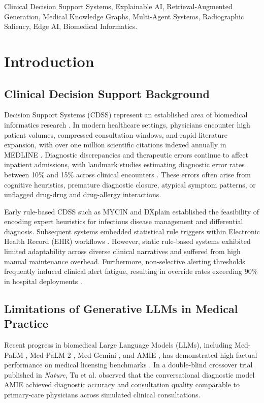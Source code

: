 \documentclass[journal,10pt,twocolumn]{IEEEtran}
\begin{document}
\begin{IEEEkeywords}
Clinical Decision Support Systems, Explainable AI, Retrieval-Augmented Generation, Medical Knowledge Graphs, Multi-Agent Systems, Radiographic Saliency, Edge AI, Biomedical Informatics.
\end{IEEEkeywords}

\IEEEpeerreviewmaketitle

\section{Introduction}

\subsection{Clinical Decision Support Background}
 Decision Support Systems (CDSS) represent an established area of biomedical informatics research \cite{shortliffe1975mycin, bates2003ten}. In modern healthcare settings, physicians encounter high patient volumes, compressed consultation windows, and rapid literature expansion, with over one million scientific citations indexed annually in MEDLINE \cite{nlm2023medline}. Diagnostic discrepancies and therapeutic errors continue to affect inpatient admissions, with landmark studies estimating diagnostic error rates between 10\% and 15\% across clinical encounters \cite{balogh2015improving}. These errors often arise from cognitive heuristics, premature diagnostic closure, atypical symptom patterns, or unflagged drug-drug and drug-allergy interactions.

Early rule-based CDSS such as MYCIN \cite{shortliffe1975mycin} and DXplain established the feasibility of encoding expert heuristics for infectious disease management and differential diagnosis. Subsequent systems embedded statistical rule triggers within Electronic Health Record (EHR) workflows \cite{rajkomar2018scalable, sendak2020real}. However, static rule-based systems exhibited limited adaptability across diverse clinical narratives and suffered from high manual maintenance overhead. Furthermore, non-selective alerting thresholds frequently induced clinical alert fatigue, resulting in override rates exceeding 90\% in hospital deployments \cite{bates2003ten, vandersijs2006overriding}.

\subsection{Limitations of Generative LLMs in Medical Practice}
Recent progress in biomedical Large Language Models (LLMs), including Med-PaLM \cite{singhal2023large}, Med-PaLM 2 \cite{singhal2023towards}, Med-Gemini \cite{saab2024capabilities}, and AMIE \cite{tu2024towards}, has demonstrated high factual performance on medical licensing benchmarks \cite{kung2023performance}. In a double-blind crossover trial published in \textit{Nature}, Tu et al. \cite{tu2024towards} observed that the conversational diagnostic model AMIE achieved diagnostic accuracy and consultation quality comparable to primary-care physicians across simulated clinical consultations.
\end{document}
